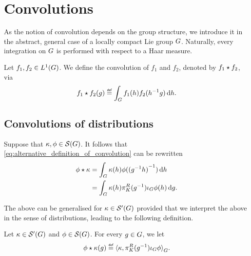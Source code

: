 \section{Convolutions}

As the notion of convolution depends on the group structure,
we introduce it in the abstract, general case of a locally compact Lie group $G$.
Naturally, every integration on $G$ is performed with respect to a Haar measure.

\begin{definition}[Convolution]
    Let $f_1, f_2 \in {L^{1} (G)}$.
    We define the convolution of $f_1$ and $f_2$,
    denoted by $f_1 \star f_2$, via
    \begin{align}
        \conv {f_1} {f_2} (g)
        \defeq \int_\Group f_1(h) f_2(h^{-1} g) \dd h.
        \label{eq:alternative_definition_of_convolution}
    \end{align}
\end{definition}

\subsection{Convolutions of distributions}

Suppose that $\kappa, \phi \in {\mathcal{S} (G)}$.
It follows that \eqref{eq:alternative_definition_of_convolution} can be rewritten
\begin{align*}
    \phi \star \kappa &= \int_G \kappa(h) \phi({(g^{-1} h)}^{-1}) \,\mathrm{d} h\\
    &= \int_G \kappa(h) \pi^R_{K}(g^{-1}) \iota_{G} \phi(h) \,\mathrm{d} g.
\end{align*}

The above can be generalised for $\kappa \in {\mathcal{S}' (G)}$
provided that we interpret the above in the sense of distributions,
leading to the following definition.

\begin{definition}[Convolution]
    Let $\kappa \in {\mathcal{S}' (G)}$ and $\phi \in {\mathcal{S} (G)}$.
    For every $g \in G$,
    we let
    \begin{align*}
        \conv \phi \kappa(g) \defeq \dualBracket [\Group] \kappa {\RightRegularRepresentation(g^{-1}) \InverseFunctionArgument \phi}.
    \end{align*}
\end{definition}

